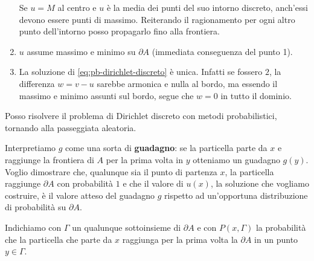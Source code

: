 \documentclass[10pt,a4paper,twoside,openright]{book}
\begin{document}
\begin{enumerate}
\begin{figure}[htpb]
\begin{tikzpicture}[x=0.75pt,y=0.75pt,yscale=-1,xscale=1]
	      	\end{tikzpicture}
		\end{figure}
		\FloatBarrier
		Se $u=M$ al centro e $u$ è la media dei punti del suo intorno discreto, anch'essi devono essere punti di massimo. Reiterando il ragionamento per ogni altro punto dell'intorno posso propagarlo fino alla frontiera.
	\item $u$ assume massimo e minimo su $\partial A$ (immediata conseguenza del punto 1).
	\item La soluzione di \eqref{eq:pb-dirichlet-discreto} è unica. Infatti se fossero $2$, la differenza $w=v-u$ sarebbe armonica e nulla al bordo, ma essendo il massimo e minimo assunti sul bordo, segue che $w=0$ in tutto il dominio.
\end{enumerate}
Posso risolvere il problema di Dirichlet discreto con metodi probabilistici, tornando alla passeggiata aleatoria. 

Interpretiamo $\displaystyle g$ come una sorta di \textbf{guadagno}: se la particella parte da $\displaystyle x$ e raggiunge la frontiera di $\displaystyle A$ per la prima volta in $\displaystyle y$ otteniamo un guadagno $\displaystyle g(y)$. Voglio dimostrare che, qualunque sia il punto di partenza $\displaystyle x$, la particella raggiunge $\displaystyle \partial A$ con probabilità $\displaystyle 1$ e che il valore di $\displaystyle u(x)$, la soluzione che vogliamo costruire, è il valore atteso del guadagno $\displaystyle g$ rispetto ad un'opportuna distribuzione di probabilità su $\displaystyle \partial A$. 

Indichiamo con $\displaystyle \Gamma $ un qualunque sottoinsieme di $\displaystyle \partial A$ e con $\displaystyle P(x,\Gamma)$ la probabilità che la particella che parte da $\displaystyle x$ raggiunga per la prima volta la $\displaystyle \partial A$ in un punto $\displaystyle y\in \Gamma $. 
\end{document}
